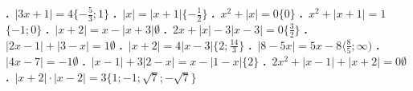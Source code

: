 \documentclass[14pt,a4paper]{extarticle}
\def\priklad#1#2{\advance\pr1\nointerlineskip\vbox to.07\vsize{\vss\hbox{{\Large\bfseries \tym\ifnum\pr<10 0\fi\the\pr}\quad#1}\vss}\vfil}
\def\printtym#1{\pr0\def\tym{#1}\priklady\vfill\newpage}
\def\priklad#1#2{\advance\pr1 \hbox{\textbf{\the\pr.} #1\qquad #2}\bigskip}
\begin{document}
\def\priklady{%
\priklad{$|3x+1| = 4$}{$\{-\frac53; 1\}$}
\priklad{$|x| = |x+1|$}{$\{-\frac12\}$}
\priklad{$x^2+|x| = 0$}{$\{0\}$}
\priklad{$x^2 + |x+1| = 1$}{$\{-1; 0\}$}
\priklad{$|x+2| = x - |x+3|$}{$\emptyset$}
\priklad{$2x + |x| - 3|x-3| = 0$}{$\{\frac32\}$}
\priklad{$|2x-1| + |3-x| = 1$}{$\emptyset$}
\priklad{$|x+2| = 4|x-3|$}{$\{2; \frac{14}{3}\}$}
\priklad{$|8-5x| = 5x-8$}{$\langle \frac85; \infty)$}
\priklad{$|4x-7| = -1$}{$\emptyset$}
\priklad{$|x-1|+3|2-x| = x - |1-x|$}{$\{2\}$}
\priklad{$2x^2 + |x-1| + |x+2| = 0$}{$\emptyset$}
\priklad{$|x+2| \cdot |x-2| = 3$}{$\{1; -1; \sqrt7; -\sqrt7\}$}
}


\printtym{A}
\end{document}
